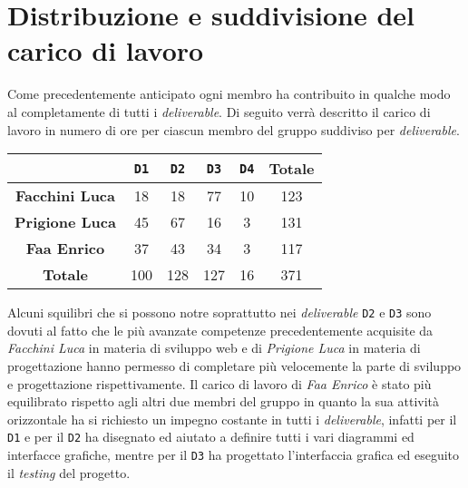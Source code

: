 \chapter{Distribuzione e suddivisione del carico di lavoro}
    Come precedentemente anticipato ogni membro ha contribuito in qualche modo al completamente di tutti i \textit{deliverable}. Di seguito verrà descritto il carico di lavoro in numero di ore per ciascun membro del gruppo suddiviso per \textit{deliverable}.
    \begin{table}[H]
        \centering
        \begin{tabular}{|c|c|c|c|c|c|}
            \hline
            & \texttt{D1} & \texttt{D2} & \texttt{D3} & \texttt{D4} & \textbf{Totale}\\
            \hline
            \textbf{Facchini Luca} & 18 & 18 & 77 & 10 & 123\\
            \hline
            \textbf{Prigione Luca} & 45 & 67 & 16 & 3 & 131\\
            \hline
            \textbf{Faa Enrico} & 37 & 43 & 34 & 3 & 117\\
            \hline
            \textbf{Totale} & 100 & 128 & 127 & 16 & 371\\
            \hline
        \end{tabular}
    \end{table}
    Alcuni squilibri che si possono notre soprattutto nei \textit{deliverable} \texttt{D2} e \texttt{D3} sono dovuti al fatto che le più avanzate competenze precedentemente acquisite da \textit{Facchini Luca} in materia di sviluppo web e di \textit{Prigione Luca} in materia di progettazione hanno permesso di completare più velocemente la parte di sviluppo e progettazione rispettivamente. Il carico di lavoro di \textit{Faa Enrico} è stato più equilibrato rispetto agli altri due membri del gruppo in quanto la sua attività orizzontale ha si richiesto un impegno costante in tutti i \textit{deliverable}, infatti per il \texttt{D1} e per il \texttt{D2} ha disegnato ed aiutato a definire tutti i vari diagrammi ed interfacce grafiche, mentre per il \texttt{D3} ha progettato l'interfaccia grafica ed eseguito il \textit{testing} del progetto.